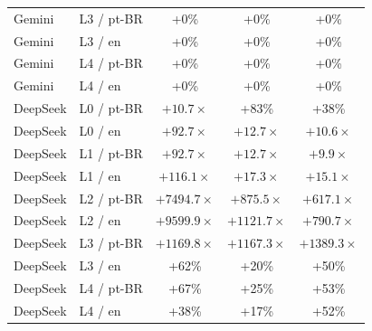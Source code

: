 \begin{table}[h]
\begin{tabular}{llccc}
Gemini & L3 / pt-BR & +0\% & +0\% & +0\% \\
Gemini & L3 / en & +0\% & +0\% & +0\% \\
Gemini & L4 / pt-BR & +0\% & +0\% & +0\% \\
Gemini & L4 / en & +0\% & +0\% & +0\% \\
\midrule
DeepSeek & L0 / pt-BR & $+10.7\times$ & +83\% & +38\% \\
DeepSeek & L0 / en & $+92.7\times$ & $+12.7\times$ & $+10.6\times$ \\
DeepSeek & L1 / pt-BR & $+92.7\times$ & $+12.7\times$ & $+9.9\times$ \\
DeepSeek & L1 / en & $+116.1\times$ & $+17.3\times$ & $+15.1\times$ \\
DeepSeek & L2 / pt-BR & $+7494.7\times$ & $+875.5\times$ & $+617.1\times$ \\
DeepSeek & L2 / en & $+9599.9\times$ & $+1121.7\times$ & $+790.7\times$ \\
DeepSeek & L3 / pt-BR & $+1169.8\times$ & $+1167.3\times$ & $+1389.3\times$ \\
DeepSeek & L3 / en & +62\% & +20\% & +50\% \\
DeepSeek & L4 / pt-BR & +67\% & +25\% & +53\% \\
DeepSeek & L4 / en & +38\% & +17\% & +52\% \\
\bottomrule
\end{tabular}
\end{table}